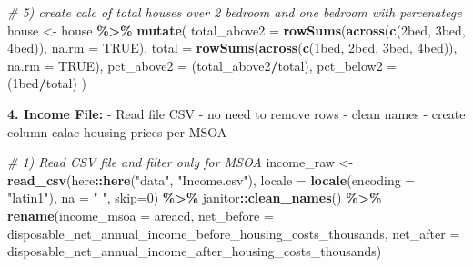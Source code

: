 \documentclass[
]{article}
\newenvironment{Shaded}{\begin{snugshade}}{\end{snugshade}}
\newcommand{\AttributeTok}[1]{\textcolor[rgb]{0.13,0.29,0.53}{#1}}
\newcommand{\CommentTok}[1]{\textcolor[rgb]{0.56,0.35,0.01}{\textit{#1}}}
\newcommand{\ConstantTok}[1]{\textcolor[rgb]{0.56,0.35,0.01}{#1}}
\newcommand{\DecValTok}[1]{\textcolor[rgb]{0.00,0.00,0.81}{#1}}
\newcommand{\FunctionTok}[1]{\textcolor[rgb]{0.13,0.29,0.53}{\textbf{#1}}}
\newcommand{\NormalTok}[1]{#1}
\newcommand{\OtherTok}[1]{\textcolor[rgb]{0.56,0.35,0.01}{#1}}
\newcommand{\SpecialCharTok}[1]{\textcolor[rgb]{0.81,0.36,0.00}{\textbf{#1}}}
\newcommand{\StringTok}[1]{\textcolor[rgb]{0.31,0.60,0.02}{#1}}
\begin{document}
\begin{Shaded}
\begin{Highlighting}[]
\CommentTok{\# 5) create calc of total houses over 2 bedroom and one bedroom with percenatege}
\NormalTok{house }\OtherTok{\textless{}{-}}\NormalTok{ house }\SpecialCharTok{\%\textgreater{}\%} 
    \FunctionTok{mutate}\NormalTok{(}
    \AttributeTok{total\_above2 =} \FunctionTok{rowSums}\NormalTok{(}\FunctionTok{across}\NormalTok{(}\FunctionTok{c}\NormalTok{(}\StringTok{\textasciigrave{}}\AttributeTok{2bed}\StringTok{\textasciigrave{}}\NormalTok{, }\StringTok{\textasciigrave{}}\AttributeTok{3bed}\StringTok{\textasciigrave{}}\NormalTok{, }\StringTok{\textasciigrave{}}\AttributeTok{4bed}\StringTok{\textasciigrave{}}\NormalTok{)), }\AttributeTok{na.rm =} \ConstantTok{TRUE}\NormalTok{),}
    \AttributeTok{total        =} \FunctionTok{rowSums}\NormalTok{(}\FunctionTok{across}\NormalTok{(}\FunctionTok{c}\NormalTok{(}\StringTok{\textasciigrave{}}\AttributeTok{1bed}\StringTok{\textasciigrave{}}\NormalTok{, }\StringTok{\textasciigrave{}}\AttributeTok{2bed}\StringTok{\textasciigrave{}}\NormalTok{, }\StringTok{\textasciigrave{}}\AttributeTok{3bed}\StringTok{\textasciigrave{}}\NormalTok{, }\StringTok{\textasciigrave{}}\AttributeTok{4bed}\StringTok{\textasciigrave{}}\NormalTok{)), }\AttributeTok{na.rm =} \ConstantTok{TRUE}\NormalTok{),}
    \AttributeTok{pct\_above2 =}\NormalTok{ (total\_above2}\SpecialCharTok{/}\NormalTok{total),}
    \AttributeTok{pct\_below2 =}\NormalTok{ (}\StringTok{\textasciigrave{}}\AttributeTok{1bed}\StringTok{\textasciigrave{}}\SpecialCharTok{/}\NormalTok{total)}
\NormalTok{    )}
\end{Highlighting}
\end{Shaded}

\textbf{4. Income File:} - Read file CSV - no need to remove rows -
clean names - create column calac housing prices per MSOA

\begin{Shaded}
\begin{Highlighting}[]
\CommentTok{\# 1) Read CSV file and filter only for MSOA}
\NormalTok{income\_raw }\OtherTok{\textless{}{-}} \FunctionTok{read\_csv}\NormalTok{(here}\SpecialCharTok{::}\FunctionTok{here}\NormalTok{(}\StringTok{"data"}\NormalTok{, }\StringTok{"Income.csv"}\NormalTok{),}
                       \AttributeTok{locale =} \FunctionTok{locale}\NormalTok{(}\AttributeTok{encoding =} \StringTok{"latin1"}\NormalTok{),}
                       \AttributeTok{na =} \StringTok{" "}\NormalTok{, }\AttributeTok{skip=}\DecValTok{0}\NormalTok{) }\SpecialCharTok{\%\textgreater{}\%}
\NormalTok{  janitor}\SpecialCharTok{::}\FunctionTok{clean\_names}\NormalTok{() }\SpecialCharTok{\%\textgreater{}\%} 
  \FunctionTok{rename}\NormalTok{(}\AttributeTok{income\_msoa =}\NormalTok{ areacd,}
         \AttributeTok{net\_before =}\NormalTok{ disposable\_net\_annual\_income\_before\_housing\_costs\_thousands,}
         \AttributeTok{net\_after =}\NormalTok{ disposable\_net\_annual\_income\_after\_housing\_costs\_thousands)}
\end{Highlighting}
\end{Shaded}
\end{document}
